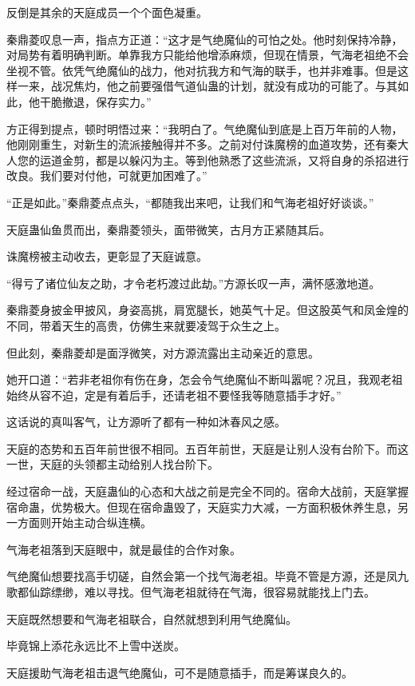 \begin{this_body}
反倒是其余的天庭成员一个个面色凝重。

秦鼎菱叹息一声，指点方正道：“这才是气绝魔仙的可怕之处。他时刻保持冷静，对局势有着明确判断。单靠我方只能给他增添麻烦，但现在情景，气海老祖绝不会坐视不管。依凭气绝魔仙的战力，他对抗我方和气海的联手，也并非难事。但是这样一来，战况焦灼，他之前要强借气道仙蛊的计划，就没有成功的可能了。与其如此，他干脆撤退，保存实力。”

方正得到提点，顿时明悟过来：“我明白了。气绝魔仙到底是上百万年前的人物，他刚刚重生，对新生的流派接触得并不多。之前对付诛魔榜的血道攻势，还有秦大人您的运道金剪，都是以躲闪为主。等到他熟悉了这些流派，又将自身的杀招进行改良。我们要对付他，可就更加困难了。”

“正是如此。”秦鼎菱点点头，“都随我出来吧，让我们和气海老祖好好谈谈。”

天庭蛊仙鱼贯而出，秦鼎菱领头，面带微笑，古月方正紧随其后。

诛魔榜被主动收去，更彰显了天庭诚意。

“得亏了诸位仙友之助，才令老朽渡过此劫。”方源长叹一声，满怀感激地道。

秦鼎菱身披金甲披风，身姿高挑，肩宽腿长，她英气十足。但这股英气和凤金煌的不同，带着天生的高贵，仿佛生来就要凌驾于众生之上。

但此刻，秦鼎菱却是面浮微笑，对方源流露出主动亲近的意思。

她开口道：“若非老祖你有伤在身，怎会令气绝魔仙不断叫嚣呢？况且，我观老祖始终从容不迫，定是有着后手，还请老祖不要怪我等随意插手才好。”

这话说的真叫客气，让方源听了都有一种如沐春风之感。

天庭的态势和五百年前世很不相同。五百年前世，天庭是让别人没有台阶下。而这一世，天庭的头领都主动给别人找台阶下。

经过宿命一战，天庭蛊仙的心态和大战之前是完全不同的。宿命大战前，天庭掌握宿命蛊，优势极大。但现在宿命蛊毁了，天庭实力大减，一方面积极休养生息，另一方面则开始主动合纵连横。

气海老祖落到天庭眼中，就是最佳的合作对象。

气绝魔仙想要找高手切磋，自然会第一个找气海老祖。毕竟不管是方源，还是凤九歌都仙踪缥缈，难以寻找。但气海老祖就待在气海，很容易就能找上门去。

天庭既然想要和气海老祖联合，自然就想到利用气绝魔仙。

毕竟锦上添花永远比不上雪中送炭。

天庭援助气海老祖击退气绝魔仙，可不是随意插手，而是筹谋良久的。


\end{this_body}
